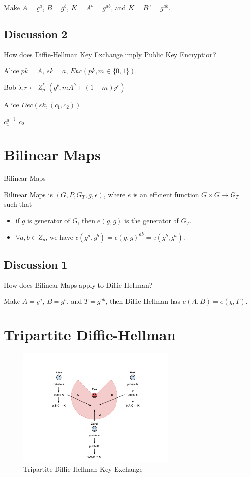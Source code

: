Make $A=g^a$, $B=g^b$, $K=A^b=g^{ab}$, and $K=B^a=g^{ab}$.


\subsection{Discussion 2}


How does Diffie-Hellman Key Exchange imply Public Key Encryption?


Alice
$pk = A$, $sk = a$, $Enc(pk, m \in \{0, 1\})$.

Bob
$b,r \gets Z^*_p$
$(g^b, mA^b+(1-m)g^r)$

Alice $Dec(sk, (c_1, c_2))$

$c_1^a \stackrel{?}{=} c_2$




\section{Bilinear Maps}

\begin{definition}{Bilinear Maps}

Bilinear Maps is $(G,P,G_T,g,e)$, where $e$ is an efficient function $G \times G \to G_T$ such that

\begin{itemize}
\item if $g$ is generator of $G$, then $e(g, g)$ is the generator of $G_T$.
\item $\forall a,b \in Z_p$, we have $e(g^a, g^b) = e(g, g)^{ab} = e(g^b, g^a)$.
\end{itemize}

\end{definition}

\subsection{Discussion 1}


How does Bilinear Maps apply to Diffie-Hellman?

Make $A=g^a$, $B=g^b$, and $T=g^{ab}$, then Diffie-Hellman has $e(A, B)=e(g, T)$.


\section{Tripartite Diffie-Hellman}

\begin{figure}[H]
\label{fig:3dh}
\centering
  \includegraphics[width=0.7\textwidth]{fig2.pdf}
\caption{Tripartite Diffie-Hellman Key Exchange}
\end{figure}

